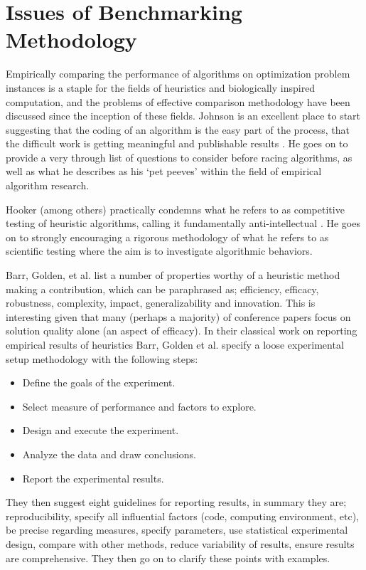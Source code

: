 \documentclass[a4paper, 11pt]{article}
\begin{document}
% 
% 
\section{Issues of Benchmarking Methodology}
Empirically	comparing	the	performance	of algorithms on optimization problem instances is a staple for the fields of heuristics and biologically inspired computation, and the problems of effective comparison methodology have been discussed since the inception of these fields. Johnson is an excellent place to start suggesting that the coding of an algorithm is the easy part of the process, that the difficult work is getting meaningful and publishable results \cite{Johnson2002a}. He goes on to provide a very through list of questions to consider before racing algorithms, as well as what he describes as his `pet peeves' within the field of empirical algorithm research.

Hooker \cite{Hooker1995} (among others) practically condemns what he refers to as competitive testing of heuristic algorithms, calling it fundamentally anti-intellectual . He goes on to strongly encouraging a rigorous methodology of what he refers to as scientific testing where the aim is to investigate algorithmic behaviors. 


Barr, Golden, et al. \cite{Barr1995} list a number of properties worthy of a heuristic method making a contribution, which can be paraphrased as; efficiency, efficacy, robustness, complexity, impact, generalizability and innovation. This is interesting given that many (perhaps a majority) of conference papers focus on solution quality alone (an aspect of efficacy).
In their classical work on reporting empirical results of heuristics Barr, Golden et al. specify a loose experimental setup methodology with the following steps:

\begin{itemize}
	\item Define the goals of the experiment.
	\item Select measure of performance and factors to explore.
	\item Design and execute the experiment.
	\item Analyze the data and draw conclusions.
	\item Report the experimental results.
\end{itemize}

They then suggest eight guidelines for reporting results, in summary they are; reproducibility, specify all influential factors (code, computing environment, etc), be precise regarding measures, specify parameters, use statistical experimental design, compare with other methods, reduce variability of results, ensure results are comprehensive. They then go on to clarify these points with examples.
\end{document}
